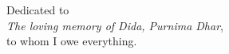 \thispagestyle{empty}
{}

\vspace*{6cm}

\begin{center}
    Dedicated to \\
    \emph{The loving memory of Dida, Purnima Dhar},\\
    to whom I owe everything.
\end{center}

\medskip
